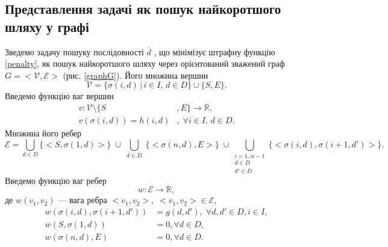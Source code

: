 \subsection{Представлення задачі як пошук найкоротшого шляху у графі}\label{offline_graph}
Зведемо задачу пошуку послідовності $ \overline{d} $ , що мінімізує штрафну функцію \eqref{penalty}, як пошук найкоротшого шляху через орієнтований зважений граф $G = <\mathcal{V}, \mathcal{E}>$ (рис. \ref{graphG}).
Його множина вершин 
$$ \mathcal{V} = \{ \sigma(i, d) \, | \, i \in I, \, d \in D \} \cup \{ S, E \} .$$
Введемо функцію ваг вершин
\begin{align*}
v : \mathcal{V} \setminus \{S&, E\} \rightarrow \mathbb{R},\\
v(\sigma(i,d)) = h(i,d)&, \; \forall i \in I, \, d \in D . 
\end{align*}
Множина його ребер
$$ \mathcal{E} = \bigcup\limits_{d \in D } \{ <S, \sigma(1, d) > \} \; \cup \bigcup\limits_{\substack{d \in D}} \{ <\sigma(n, d), E > \} \; \cup 
\bigcup\limits_{\substack{i = 1..n-1 \\d \in D \\d' \in D}} \{ <\sigma(i, d), \sigma(i+1, d') > \} .$$
Введемо функцію ваг ребер 
$$ w : \mathcal{E} \rightarrow \mathbb{R}, $$
де $ w(v_1, v_2) $ ---  вага ребра $ <v_1, v_2>, \; <v_1, v_2> \in \mathcal{E} $,
\begin{align*}
w(\sigma(i, d), \sigma(i + 1, d ') ) &= g(d, d'), \; \forall d, d' \in D, i \in I,\\
w(S,  \sigma(1, d) ) &= 0 ,  \forall d \in D,\\
w(\sigma(n, d), E ) &= 0 ,  \forall d \in D.
\end{align*}

